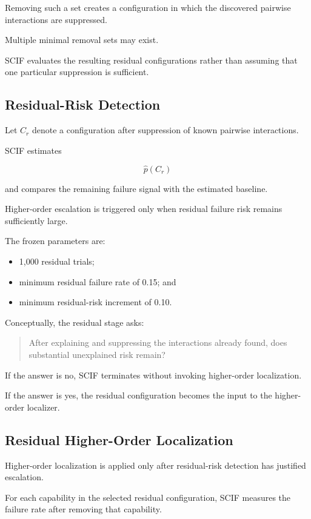 Removing such a set creates a configuration in which the discovered pairwise interactions are suppressed.

Multiple minimal removal sets may exist.

SCIF evaluates the resulting residual configurations rather than assuming that one particular suppression is sufficient.

\subsection{Residual-Risk Detection}

Let \(C_r\) denote a configuration after suppression of known pairwise interactions.

SCIF estimates

\[
\hat{p}(C_r)
\]

and compares the remaining failure signal with the estimated baseline.

Higher-order escalation is triggered only when residual failure risk remains sufficiently large.

The frozen parameters are:

\begin{itemize}
\tightlist
\item
  1,000 residual trials;
\item
  minimum residual failure rate of 0.15; and
\item
  minimum residual-risk increment of 0.10.
\end{itemize}

Conceptually, the residual stage asks:

\begin{quote}
After explaining and suppressing the interactions already found, does substantial unexplained risk remain?
\end{quote}

If the answer is no, SCIF terminates without invoking higher-order localization.

If the answer is yes, the residual configuration becomes the input to the higher-order localizer.

\subsection{Residual Higher-Order Localization}

Higher-order localization is applied only after residual-risk detection has justified escalation.

For each capability in the selected residual configuration, SCIF measures the failure rate after removing that capability.

